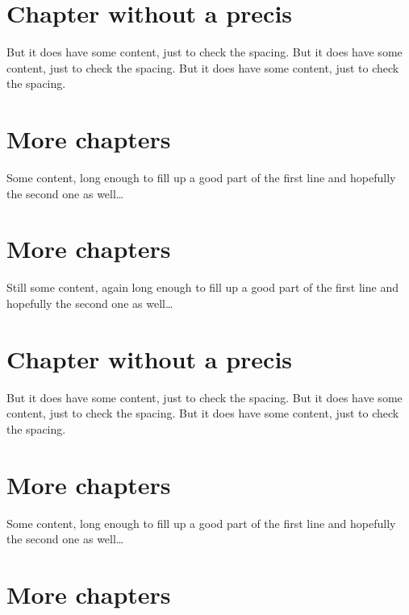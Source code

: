 \documentclass[openany]{sbabook}
\begin{document}
\chapter{Chapter without a precis}

But it does have some content, just to check the spacing.
But it does have some content, just to check the spacing.
But it does have some content, just to check the spacing.

\chapter{More chapters}

Some content, long enough to fill up a good part of the first line and hopefully the second one as well…

\chapter{More chapters}

Still some content, again long enough to fill up a good part of the first line and hopefully the second one as well…

\chapter{Chapter without a precis}

But it does have some content, just to check the spacing.
But it does have some content, just to check the spacing.
But it does have some content, just to check the spacing.

\chapter{More chapters}

Some content, long enough to fill up a good part of the first line and hopefully the second one as well…

\chapter{More chapters}
\end{document}
